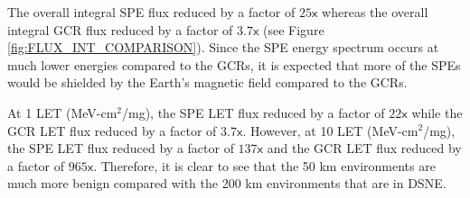 \documentclass{hitec}
\begin{document}
The overall integral SPE flux reduced by a factor of $25\textsf{x}$ whereas the overall integral GCR flux reduced by a factor of $3.7\textsf{x}$ (see Figure \ref{fig:FLUX_INT_COMPARISON}). Since the SPE energy spectrum occurs at much lower energies compared to the GCRs, it is expected that more of the SPEs would be shielded by the Earth's magnetic field compared to the GCRs.

At 1 LET (MeV-cm$^2$/mg), the SPE LET flux reduced by a factor of $22\textsf{x}$ while the GCR LET flux reduced by a factor of $3.7\textsf{x}$. However, at 10 LET (MeV-cm$^2$/mg), the SPE LET flux reduced by a factor of $137\textsf{x}$ and the GCR LET flux reduced by a factor of $965\textsf{x}$. Therefore, it is clear to see that the 50 km environments are much more benign compared with the 200 km environments that are in DSNE.
\end{document}
